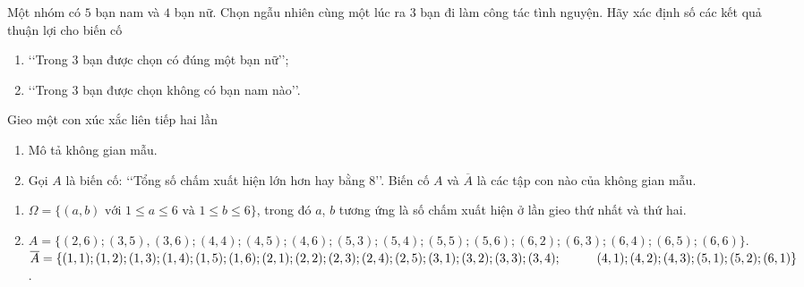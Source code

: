\begin{vd}%
	Một nhóm có $ 5 $ bạn nam và $ 4 $ bạn nữ. Chọn ngẫu nhiên cùng một lúc ra $ 3 $ bạn đi làm công tác tình nguyện. Hãy xác định số các kết quả thuận lợi cho biến cố
	\begin{enumerate}
		\item \lq\lq Trong $ 3 $ bạn được chọn có đúng một bạn nữ\rq\rq;
		\item \lq\lq Trong $ 3 $ bạn được chọn không có bạn nam nào\rq\rq.
	\end{enumerate}
\end{vd}
\baitaptl
\begin{bt}%
	Gieo một con xúc xắc liên tiếp hai lần
	\begin{enumerate}
		\item Mô tả không gian mẫu.
		\item Gọi $A$ là biến cố: \lq\lq Tổng số chấm xuất hiện lớn hơn hay bằng $8$\rq\rq. Biến cố $A$ và $\overline{A}$ là các tập con nào của không gian mẫu.
	\end{enumerate}
	\loigiai
	{
		\begin{enumerate}
			\item $\Omega= \{(a, b) \text{ với } 1\le a \le 6 \text{ và } 1\le b\le 6\}$, trong đó $a$, $b$ tương ứng là số chấm xuất hiện ở lần gieo thứ nhất và thứ hai.
			\item $A= \{(2,6); (3,5), (3,6); (4,4); (4,5); (4,6); (5,3); (5,4); (5,5); (5,6); (6,2); (6,3); (6,4); (6,5); (6,6)\}$.\\
			$\overline{A}= \{(1,1); (1,2); (1,3); (1,4); (1,5); (1,6); (2,1); (2,2); (2,3); (2,4); (2,5); (3,1); (3,2); (3,3); (3,4);\\
			\hspace*{1cm} (4,1); (4,2); (4,3); (5,1); (5,2); (6,1)\}$.
		\end{enumerate}
	}
\end{bt}


